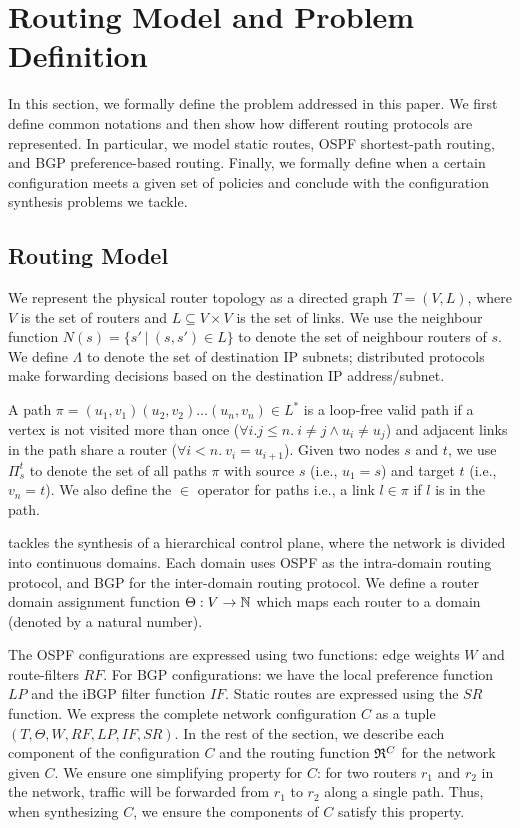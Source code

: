 \section{Routing Model and Problem Definition}

In this section, we formally define the problem addressed in this
paper.  We first define common notations and then show how different
routing protocols are represented.  In particular, we model static
routes, OSPF shortest-path routing, and BGP preference-based routing.
Finally, we formally define when a certain configuration meets a given
set of policies and conclude with the configuration synthesis problems
we tackle.

\subsection{Routing Model}

We represent the physical router topology as a directed graph $T=(V, L)$,
where $V$ is the set of routers and $L\subseteq V\times V$ is the set of links. 
We use the neighbour function $N(s) = \{s'\ | \ (s,s') \in L \}$ to denote 
the set of neighbour routers of $s$. 
We define $\Lambda$ to denote the set of destination IP subnets;
distributed protocols make forwarding decisions based on the 
destination IP address/subnet.

A path $\pi = (u_1,v_1) (u_2, v_2) \ldots (u_n, v_n) \in L^*$ is a loop-free valid path if
a  vertex is not visited more than once ($\forall i.j \leq n. 
~i \not= j \wedge u_i \not= u_j$) and adjacent links in the
path share a router ($\forall i < n. ~v_i = u_{i+1}$).
Given two nodes $s$ and $t$, we use $\Pi_s^t$ to denote the set of all paths
$\pi$ with source $s$ (i.e., $u_1=s$) and target $t$ (i.e., $v_n=t$). 
We also define the $\in$ operator for paths i.e., a link $l \in
\pi$ if $l$ is in the path. 

\name tackles the synthesis of a hierarchical control plane, 
where the network is divided into continuous domains. 
Each domain uses OSPF as the intra-domain routing protocol, 
and BGP for the inter-domain routing protocol. 
We define a router domain assignment function
$\Theta: V \rightarrow \mathbb{N}$ which maps each router to a domain 
(denoted by a natural number).

The OSPF configurations are expressed 
using two functions: edge weights $W$ and
route-filters $RF$. For BGP configurations: 
we have the local preference function $LP$ 
and the iBGP filter function $IF$. Static 
routes are expressed using the $SR$ function.
We express the complete network configuration $C$
as a tuple $(T,\Theta,W,RF,LP,IF,SR)$.  In the 
rest of the section, we describe each component 
of the configuration $C$ and the routing function 
$\mathfrak{R}^C$ for the network given $C$. We ensure one  
simplifying property for $C$: for two 
routers $r_1$ and $r_2$ in the network,
traffic will be forwarded from $r_1$ to $r_2$ 
along a single path. 
Thus, when synthesizing $C$, we ensure the components
of $C$ satisfy this property.


